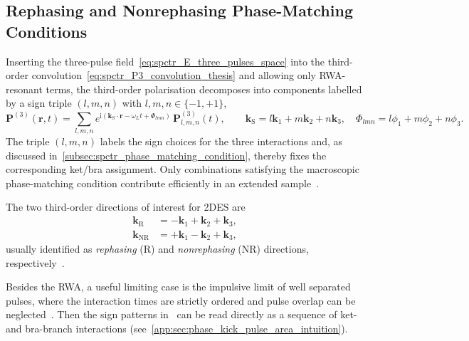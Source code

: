 \subsection{Rephasing and Nonrephasing Phase-Matching Conditions}
\label{subsec:spctr_rephasing_nonrephasing}
Inserting the three-pulse field~\autoref{eq:spctr_E_three_pulses_space} into the third-order convolution~\autoref{eq:spctr_P3_convolution_thesis} and allowing only RWA-resonant terms, the third-order polarisation decomposes into components labelled by a sign triple $(l,m,n)$ with $l,m,n\in\{-1,+1\}$,
\begin{equation*}
	\boldsymbol{P}^{(3)}(\boldsymbol{r},t)
	=
	\sum_{l,m,n}
	e^{\mathrm{i}(\boldsymbol{k}_{\mathrm{S}}\cdot\boldsymbol{r} - \omega_{L} t + \Phi_{lmn})}\,
	\boldsymbol{P}^{(3)}_{l,m,n}(t),
	\qquad
	\boldsymbol{k}_{\mathrm{S}} = l\boldsymbol{k}_1+m\boldsymbol{k}_2+n\boldsymbol{k}_3,\quad
	\Phi_{lmn} = l\phi_1+m\phi_2+n\phi_3.
\end{equation*}
The triple $(l,m,n)$ labels the sign choices for the three interactions and, as discussed in~\autoref{subsec:spctr_phase_matching_condition}, thereby fixes the corresponding ket/bra assignment.
Only combinations satisfying the macroscopic phase-matching condition contribute efficiently in an extended sample~\cite{boyd2008chapter6nonlinear}.

The two third-order directions of interest for 2DES are
\begin{align}
	\boldsymbol{k}_{\mathrm{R}}    & = -\boldsymbol{k}_1 + \boldsymbol{k}_2 + \boldsymbol{k}_3, \label{eq:spctr_kR_def} \\
	\boldsymbol{k}_{\mathrm{NR}} & = +\boldsymbol{k}_1 - \boldsymbol{k}_2 + \boldsymbol{k}_3,
	\label{eq:spctr_kNR_def}
\end{align}
usually identified as \emph{rephasing} (R) and \emph{nonrephasing} (NR) directions, respectively~\cite{mukamel1995principlesnonlinearoptical, cho2009twodimensionalopticalspectroscopy, freschetal2023twodimensionalelectronicspectroscopy}.

Besides the RWA, a useful limiting case is the impulsive limit of well separated pulses, where the interaction times are strictly ordered and pulse overlap can be neglected~\cite{cho2009twodimensionalopticalspectroscopy,mukamel1995principlesnonlinearoptical}.
Then the sign patterns in~ can be read directly as a sequence of ket- and bra-branch interactions (see~\autoref{app:sec:phase_kick_pulse_area_intuition}).

